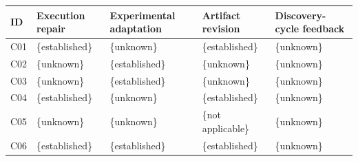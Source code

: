 \begin{tabular}{lp{.20\linewidth}p{.20\linewidth}p{.20\linewidth}p{.20\linewidth}}
\toprule
ID & Execution repair & Experimental adaptation & Artifact revision & Discovery-cycle feedback \\
\midrule
C01 & \{established\} & \{unknown\} & \{established\} & \{unknown\} \\
C02 & \{unknown\} & \{established\} & \{unknown\} & \{unknown\} \\
C03 & \{unknown\} & \{established\} & \{unknown\} & \{unknown\} \\
C04 & \{established\} & \{unknown\} & \{established\} & \{unknown\} \\
C05 & \{unknown\} & \{unknown\} & \{not applicable\} & \{unknown\} \\
C06 & \{established\} & \{established\} & \{established\} & \{unknown\} \\
\bottomrule
\end{tabular}
